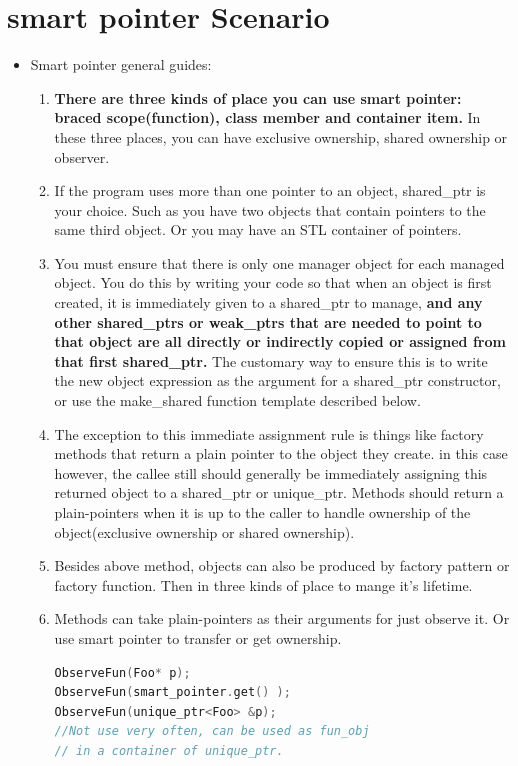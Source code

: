 \documentclass[a4paper,12pt,twoside]{book}
\begin{document}
\section{smart pointer Scenario}

\begin{itemize}

\item Smart pointer general guides:

\begin{enumerate}
\item \textbf{There are three kinds of place you can use smart pointer: braced scope(function), class member and container item.} In these three places, you can have exclusive ownership, shared ownership or observer.  

\item If the program uses more than one pointer to an object, shared\_ptr is your choice.  Such as you have two objects that contain pointers to the same third object. Or you may have an STL container of pointers.

\item You must ensure that there is only one manager object for each managed object. You do this by writing your code so that when an object is first created, it is immediately given to a shared\_ptr to manage, \textbf{and any other shared\_ptrs or weak\_ptrs that are needed to point to that object are all directly or indirectly copied or assigned from that first shared\_ptr.} The customary way to ensure this is to write the new object expression as the argument for a shared\_ptr constructor, or use the make\_shared function template described below.

\item The exception to this immediate assignment rule is things like factory methods that return a plain pointer to the object they create. in this case however, the callee still should generally be immediately assigning this returned object to a shared\_ptr or unique\_ptr.  Methods should return a plain-pointers when it is up to the caller to handle ownership of the object(exclusive ownership or shared ownership).

\item Besides above method, objects can also be produced by factory pattern or factory function. Then in three kinds of place to mange it's lifetime. 

\item Methods can take plain-pointers as their arguments for just observe it. Or use smart pointer to transfer or get ownership.
\begin{lstlisting}[frame=single, language=c++]
ObserveFun(Foo* p);
ObserveFun(smart_pointer.get() );
ObserveFun(unique_ptr<Foo> &p);
//Not use very often, can be used as fun_obj
// in a container of unique_ptr.


\end{lstlisting}
\end{enumerate}
\end{itemize}
\end{document}
